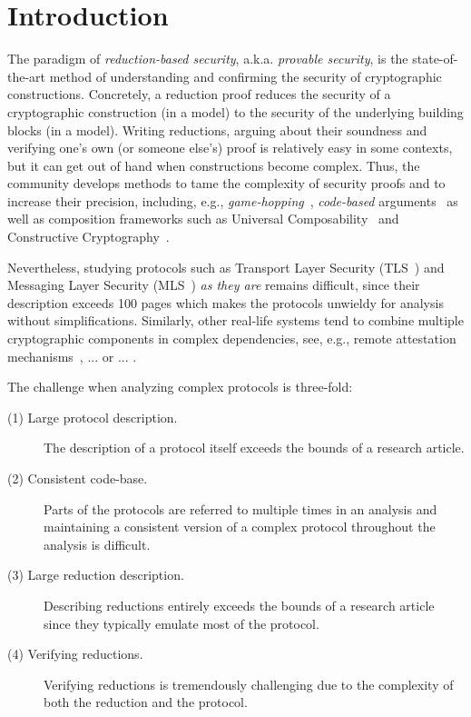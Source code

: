 \section{Introduction}
The paradigm of \emph{reduction-based security}, a.k.a. \emph{provable security}, is the state-of-the-art method of understanding and confirming the security of cryptographic constructions. Concretely, a reduction proof reduces the security of a cryptographic construction (in a model) to the security of the underlying building blocks (in a model). Writing reductions, arguing about their soundness and verifying one's own (or someone else's) proof is relatively easy in some contexts, but it can get out of hand when constructions become complex. Thus, the community develops methods to tame the complexity of security proofs and to increase their precision, including, e.g., \emph{game-hopping}~\cite{EPRINT:Shoup04}, \emph{code-based} arguments~\cite{EC:BelRog06} as well as composition frameworks such as Universal Composability~\cite{FOCS:Canetti01} and Constructive Cryptography~\cite{FC:Maurer10}.

Nevertheless, studying protocols such as Transport Layer Security (TLS~\cite{TLS13})
and Messaging Layer Security (MLS~\cite{MLS}) \emph{as they are} 
remains difficult, since their description exceeds 100 pages which makes the protocols unwieldy for analysis without simplifications. Similarly, other real-life systems tend to combine multiple cryptographic components in complex dependencies,
see, e.g., remote attestation mechanisms~\cite{https://arxiv.org/pdf/2102.08804.pdf,https://en.wikipedia.org/wiki/Trusted_Computing}, ... or ... .

The challenge when analyzing complex protocols is three-fold:
\begin{description}
\item[(1) Large protocol description.] The description of a protocol itself exceeds the bounds of a research article.
\item[(2) Consistent code-base.] Parts of the protocols are referred to multiple times in an analysis and maintaining a consistent version of a complex protocol throughout the analysis is difficult.
\item[(3) Large reduction description.] Describing reductions entirely exceeds the bounds of a research article since they typically emulate most of the protocol.
\item[(4) Verifying reductions.] Verifying reductions is tremendously challenging due to the complexity of both the reduction and the protocol.
\end{description}

